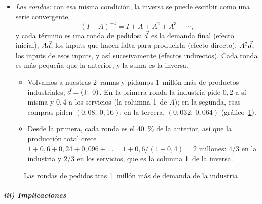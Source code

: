 \documentclass[11pt]{article}
\begin{document}
\begin{itemize}
\begin{itemize}
  \item En palabras, la economía tiene que ser \emph{productiva}: capaz de producir más de lo que gasta en producir y dejar algo para la demanda final. Con una sola rama, basta con $a_{11}<1$.
  \item Se cumple siempre que cada columna de $A$ sume menos de 1, es decir, que cada rama pague algo de valor añadido o de importaciones \eqref{eq:suma-columna}, como ocurre en cualquier tabla real.
  \end{itemize}
\item \emph{Las rondas}: con esa misma condición, la inversa se puede escribir como una serie convergente,
\begin{equation}\label{eq:serie}
(I-A)^{-1}=I+A+A^2+A^3+\cdots,
\end{equation}
  y cada término es una ronda de pedidos: $\vec{d}$ es la demanda final (efecto inicial); $A\vec{d}$, los inputs que hacen falta para producirla (efecto directo); $A^2\vec{d}$, los inputs de esos inputs, y así sucesivamente (efectos indirectos). Cada ronda es más pequeña que la anterior, y la suma es la inversa.
  \begin{itemize}
  \item Volvamos a nuestras 2~ramas y pidamos 1~millón más de productos industriales, $\vec{d}=(1;\ 0)$. En la primera ronda la industria pide $0{,}2$ a sí misma y $0{,}4$ a los servicios (la columna 1~de $A$); en la segunda, esas compras piden $(0{,}08;\ 0{,}16)$; en la tercera, $(0{,}032;\ 0{,}064)$ (gráfico~\ref{fig:iterativo}).
  \item Desde la primera, cada ronda es el 40~\% de la anterior, así que la producción total crece $1+0{,}6+0{,}24+0{,}096+\dots=1+0{,}6/(1-0{,}4)=2$ millones: $4/3$ en la industria y $2/3$ en los servicios, que es la columna 1~de la inversa.
  \end{itemize}
\end{itemize}

\begin{figure}[H]
\centering
\caption{Las rondas de pedidos tras 1~millón más de demanda de la industria}\label{fig:iterativo}
\end{figure}

\subparagraph{iii) Implicaciones}
\end{document}
